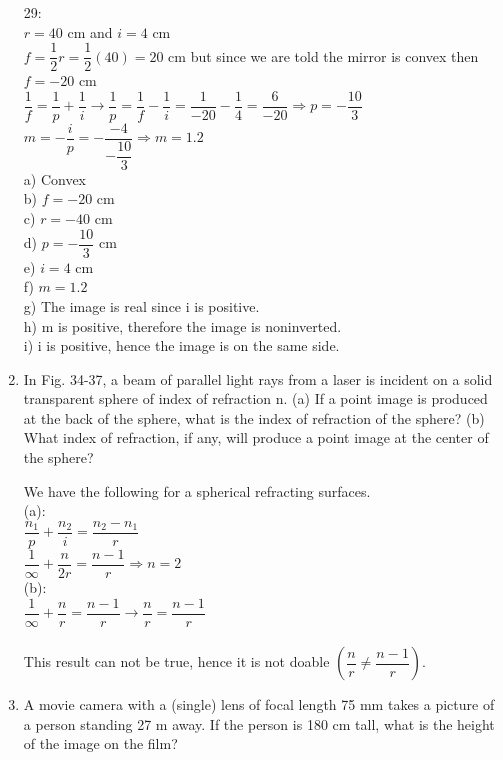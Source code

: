 \documentclass[fleqn]{article}
\begin{document}
\begin{enumerate}
    \textcolor{hwColor}{
      29: \\
      $r=40$ cm and $i=4$ cm \\
      $f=\dfrac{1}{2}r=\dfrac{1}{2}(40)=20$ cm but since we are told the mirror is convex then $f=-20$ cm \\
      $\dfrac{1}{f}=\dfrac{1}{p}+\dfrac{1}{i} \rightarrow \dfrac{1}{p}=\dfrac{1}{f}-\dfrac{1}{i}=\dfrac{1}{-20}-\dfrac{1}{4}=\dfrac{6}{-20} \Longrightarrow p=-\dfrac{10}{3}$ \\
      $m=-\dfrac{i}{p}=-\dfrac{-4}{-\dfrac{10}{3}} \Longrightarrow m=1.2$ \\
      a) Convex \\
      b) $f=-20$ cm \\
      c) $r=-40$ cm \\
      d) $p=-\dfrac{10}{3}$ cm \\
      e) $i=4$ cm \\
      f) $m=1.2$ \\
      g) The image is real since i is positive. \\
      h) m is positive, therefore the image is noninverted. \\
      i) i is positive, hence the image is on the same side. \\
    }


    \item In Fig. 34-37, a beam of parallel light rays from a laser is incident on a solid transparent sphere of index of refraction n. (a) If a point image is produced at the back of the sphere, what is the index of refraction of the sphere? (b) What index of refraction, if any, will produce a point image at the center of the sphere?

    \textcolor{hwColor}{
      We have the following for a spherical refracting surfaces.\\
      (a): \\
      $\dfrac{n_1}{p}+\dfrac{n_2}{i}=\dfrac{n_2-n_1}{r}$ \\
      $\dfrac{1}{\infty}+\dfrac{n}{2r}=\dfrac{n-1}{r} \Longrightarrow n=2$ \\
      \bigbreak
      (b): \\
      $\dfrac{1}{\infty}+\dfrac{n}{r}=\dfrac{n-1}{r} \rightarrow \dfrac{n}{r}=\dfrac{n-1}{r}$ \\
      \\
      This result can not be true, hence it is not doable $(\dfrac{n}{r} \neq \dfrac{n-1}{r})$.
    }
    
    \item A movie camera with a (single) lens of focal length 75 mm takes a picture of a person standing 27 m away. If the person is 180 cm tall, what is the height of the image on the film?


\end{enumerate}
\end{document}
